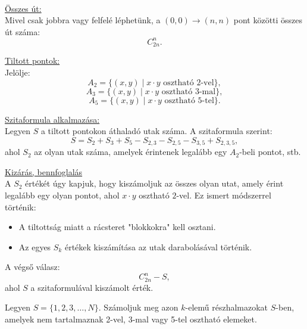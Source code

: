 \begin{solution}
~

\underline{Összes út:}\\

Mivel csak jobbra vagy felfelé léphetünk, a $(0,0)\to(n,n)$ pont
közötti összes út száma: 
\[
C_{2n}^{n}.
\]

\underline{Tiltott pontok:}\\

Jelölje: 
\[
A_{2}=\{(x,y)\mid x\cdot y\text{ osztható }2\text{-vel}\},
\]
\[
A_{3}=\{(x,y)\mid x\cdot y\text{ osztható }3\text{-mal}\},
\]
\[
A_{5}=\{(x,y)\mid x\cdot y\text{ osztható }5\text{-tel}\}.
\]

\underline{Szitaformula alkalmazása:}\\

Legyen $S$ a tiltott pontokon áthaladó utak száma. A szitaformula
szerint: 
\[
S=S_{2}+S_{3}+S_{5}-S_{2,3}-S_{2,5}-S_{3,5}+S_{2,3,5},
\]
ahol $S_{2}$ az olyan utak száma, amelyek érintenek legalább egy
$A_{2}$-beli pontot, stb.

\underline{Kizárás, bennfoglalás}\\

A $S_{2}$ értékét úgy kapjuk, hogy kiszámoljuk az összes olyan utat,
amely érint legalább egy olyan pontot, ahol $x\cdot y$ osztható $2$-vel.
Ez ismert módszerrel történik: 
\begin{itemize}
\item A tiltottság miatt a rácsteret "blokkokra" kell osztani. 
\item Az egyes $S_{k}$ értékek kiszámítása az utak darabolásával történik. 
\end{itemize}
A végső válasz: 
\[
\boxed{C_{2n}^{n}-S},
\]
ahol $S$ a szitaformulával kiszámolt érték.
\end{solution}
\begin{extraproblem}
 Legyen $S=\{1,2,3,\dots,N\}$. Számoljuk meg azon $k$-elemű részhalmazokat
$S$-ben, amelyek nem tartalmaznak 2-vel, 3-mal vagy 5-tel osztható
elemeket.
\end{extraproblem}

